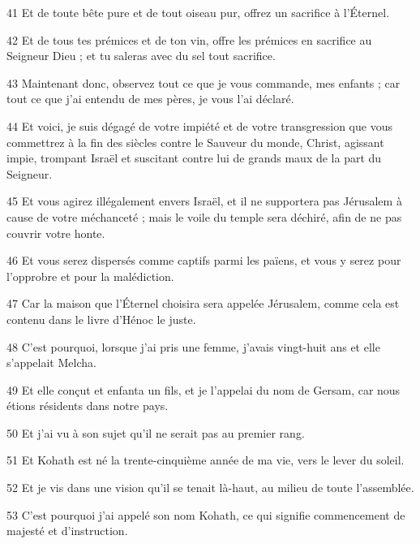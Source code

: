 \par 41 Et de toute bête pure et de tout oiseau pur, offrez un sacrifice à l'Éternel.

\par 42 Et de tous tes prémices et de ton vin, offre les prémices en sacrifice au Seigneur Dieu ; et tu saleras avec du sel tout sacrifice.

\par 43 Maintenant donc, observez tout ce que je vous commande, mes enfants ; car tout ce que j'ai entendu de mes pères, je vous l'ai déclaré.

\par 44 Et voici, je suis dégagé de votre impiété et de votre transgression que vous commettrez à la fin des siècles contre le Sauveur du monde, Christ, agissant impie, trompant Israël et suscitant contre lui de grands maux de la part du Seigneur.

\par 45 Et vous agirez illégalement envers Israël, et il ne supportera pas Jérusalem à cause de votre méchanceté ; mais le voile du temple sera déchiré, afin de ne pas couvrir votre honte.

\par 46 Et vous serez dispersés comme captifs parmi les païens, et vous y serez pour l'opprobre et pour la malédiction.

\par 47 Car la maison que l'Éternel choisira sera appelée Jérusalem, comme cela est contenu dans le livre d'Hénoc le juste.

\par 48 C'est pourquoi, lorsque j'ai pris une femme, j'avais vingt-huit ans et elle s'appelait Melcha.

\par 49 Et elle conçut et enfanta un fils, et je l'appelai du nom de Gersam, car nous étions résidents dans notre pays.

\par 50 Et j'ai vu à son sujet qu'il ne serait pas au premier rang.

\par 51 Et Kohath est né la trente-cinquième année de ma vie, vers le lever du soleil.

\par 52 Et je vis dans une vision qu'il se tenait là-haut, au milieu de toute l'assemblée.

\par 53 C'est pourquoi j'ai appelé son nom Kohath, ce qui signifie commencement de majesté et d'instruction.

